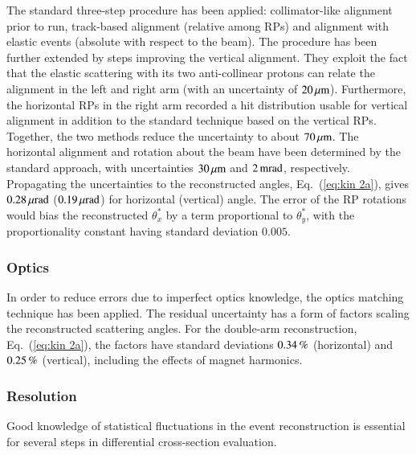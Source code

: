 The standard three-step procedure \cite{totem-ijmp} has been applied: collimator-like alignment prior to run, track-based alignment (relative among RPs) and alignment with elastic events (absolute with respect to the beam). The procedure has been further extended by steps improving the vertical alignment. They exploit the fact that the elastic scattering with its two anti-collinear protons can relate the alignment in the left and right arm (with an uncertainty of $20\,{\rm \mu m}$). Furthermore, the horizontal RPs in the right arm recorded a hit distribution usable for vertical alignment in addition to the standard technique based on the vertical RPs. Together, the two methods reduce the uncertainty to about $70\,{\rm \mu m}$. The horizontal alignment and rotation about the beam have been determined by the standard approach, with uncertainties $30\,{\rm \mu m}$ and $2\,{\rm m rad}$, respectively. Propagating the uncertainties to the reconstructed angles, Eq.~(\ref{eq:kin 2a}), gives $0.28\,{\rm \mu rad}$ ($0.19\,{\rm \mu rad}$) for horizontal (vertical) angle. The error of the RP rotations would bias the reconstructed $\theta_x^*$ by a term proportional to $\theta_y^*$, with the proportionality constant having standard deviation $0.005$.



\subsubsection{Optics}
\label{sec:optics}

In order to reduce errors due to imperfect optics knowledge, the optics matching technique \cite{totem-optics} has been applied. The residual uncertainty has a form of factors scaling the reconstructed scattering angles. For the double-arm reconstruction, Eq.~(\ref{eq:kin 2a}), the factors have standard deviations $0.34\,{\rm \%}$ (horizontal) and $0.25\,{\rm \%}$ (vertical), including the effects of magnet harmonics.



\subsubsection{Resolution}
\label{sec:resolution}

Good knowledge of statistical fluctuations in the event reconstruction is essential for several steps in differential cross-section evaluation.

